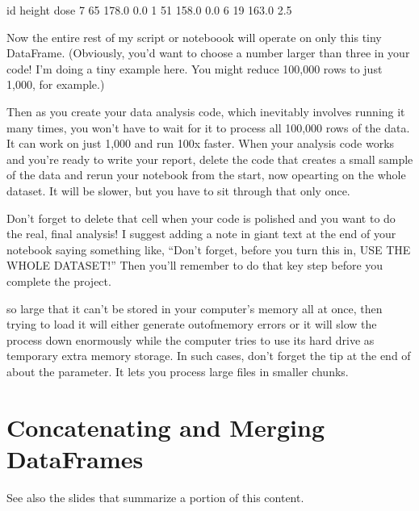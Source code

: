 \documentclass[letterpaper,10pt,english]{jupyterBook}
\begin{document}
\begin{sphinxVerbatim}[commandchars=\\\{\}]
   id  height  dose
7  65   178.0   0.0
1  51   158.0   0.0
6  19   163.0   2.5
\end{sphinxVerbatim}

\sphinxAtStartPar
Now the entire rest of my script or noteboook will operate on only this tiny DataFrame.  (Obviously, you’d want to choose a number larger than three in your code!  I’m doing a tiny example here.  You might reduce 100,000 rows to just 1,000, for example.)

\sphinxAtStartPar
Then as you create your data analysis code, which inevitably involves running it many times, you won’t have to wait for it to process all 100,000 rows of the data.  It can work on just 1,000 and run 100x faster.  When your analysis code works and you’re ready to write your report, delete the code that creates a small sample of the data and re\sphinxhyphen{}run your notebook from the start, now opearting on the whole dataset.  It will be slower, but you have to sit through that only once.

\sphinxAtStartPar
{}  Don’t forget to delete that cell when your code is polished and you want to do the real, final analysis!  I suggest adding a note in giant text at the end of your notebook saying something like, “Don’t forget, before you turn this in, USE THE WHOLE DATASET!”  Then you’ll remember to do that key step before you complete the project.

\sphinxAtStartPar
{} so large that it can’t be stored in your computer’s memory all at once, then trying to load it will either generate out\sphinxhyphen{}of\sphinxhyphen{}memory errors or it will slow the process down enormously while the computer tries to use its hard drive as temporary extra memory storage.  In such cases, don’t forget the tip at the end of  about the  parameter.  It lets you process large files in smaller chunks.


\chapter{Concatenating and Merging DataFrames}
\label{\detokenize{chapter-12-concat-and-merge:concatenating-and-merging-dataframes}}\label{\detokenize{chapter-12-concat-and-merge::doc}}
\sphinxAtStartPar
See also the slides that summarize a portion of this content.
\end{document}
